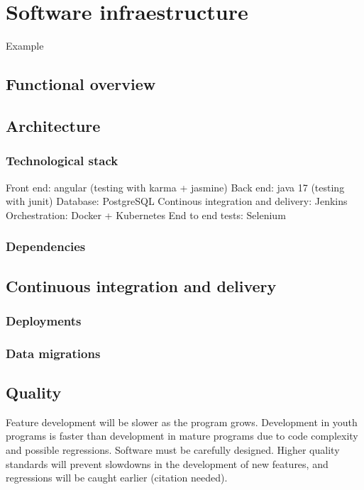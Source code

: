 \documentclass[11pt,spanish]{article} %
\begin{document}
\maketitle
\tableofcontents %
\setlength\parindent{0pt} %

\newpage

\section{Software infraestructure}

Example \cite{example}

\subsection{Functional overview}


\subsection{Architecture}
\subsubsection{Technological stack}
Front end: angular (testing with karma + jasmine)
Back end: java 17 (testing with junit)
Database: PostgreSQL
Continous integration and delivery: Jenkins
Orchestration: Docker + Kubernetes
End to end tests: Selenium

\subsubsection{Dependencies}

\subsection{Continuous integration and delivery}
\subsubsection{Deployments}
\subsubsection{Data migrations}


\subsection{Quality}
Feature development will be slower as the program grows. Development in youth programs is faster than development in mature programs due to code complexity and possible regressions.
Software must be carefully designed. Higher quality standards will prevent slowdowns in the development of new features, and regressions will be caught earlier (citation needed).
\end{document}
